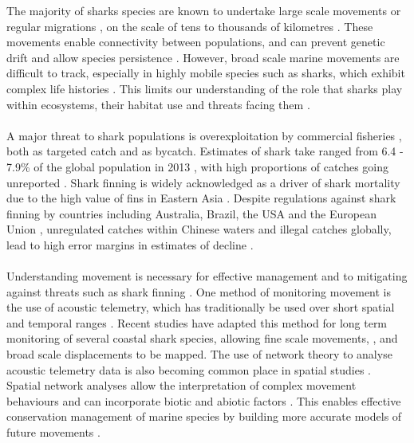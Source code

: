 \documentclass[11pt,a4paper]{article}
\begin{document}
	The majority of sharks species are known to undertake large scale movements or regular migrations \citep{Speed2010,Espinoza2016}, on the scale of tens to thousands of kilometres \citep{Braccini2016a}. These movements enable connectivity between populations, and can prevent genetic drift and allow species persistence \citep{Olds2012,Espinoza2016}. However, broad scale marine movements are difficult to track, especially in highly mobile species such as sharks, which exhibit complex life histories \citep{Baeyaert2018}. This limits our understanding of the role that sharks play within ecosystems, their habitat use and threats facing them \citep{Espinoza2016}.\\
	\\
	A major threat to shark populations is overexploitation by commercial fisheries \citep{Worm2013}, both as targeted catch and as bycatch. Estimates of shark take ranged from 6.4 - 7.9\% of the global population in 2013 \citep{Worm2013}, with high proportions of catches going unreported \citep{Clarke2006}. Shark finning is widely acknowledged as a driver of shark mortality due to the high value of fins in Eastern Asia \citep{Clarke2013}. Despite regulations against shark finning by countries including Australia, Brazil, the USA and the European Union \citep{Clarke2006,Benavides2011,Braccini2017c}, unregulated catches within Chinese waters and illegal catches globally, lead to high error margins in estimates of decline \citep{Worm2013}.\\
	\\
	Understanding movement is necessary for effective management and to mitigating against threats such as shark finning \citep{Espinoza2016}. One method of monitoring movement is the use of acoustic telemetry, which has traditionally be used over short spatial and temporal ranges \citep{Braccini2017}. Recent studies have adapted this method for long term monitoring of several coastal shark species, allowing fine scale movements, \citep{Lea2016}, and broad scale displacements \citep{Espinoza2016} to be mapped. The use of network theory to analyse acoustic telemetry data is also becoming common place in spatial studies \citep{Jacoby2016}. Spatial network analyses allow the interpretation of complex movement behaviours and can incorporate biotic and abiotic factors \citep{Lea2016}. This enables effective conservation management of marine species by building more accurate models of future movements \citep{Jacoby2016}.\\ 
	\\
\end{document}
